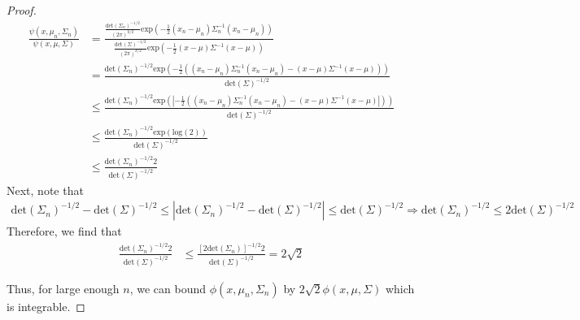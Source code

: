 \documentclass{article}
\begin{document}
\begin{proof}
\begin{align*}
	\frac{\psi(x, \mu_n, \Sigma_n)}{\psi(x, \mu, \Sigma)} &= \frac{\frac{\text{det}(\Sigma_n)^{-1/2}}{(2\pi)^{k/2}}\text{exp}\left( - \frac{1}{2}(x_n - \mu_n)\Sigma_n^{-1}(x_n - \mu_n)\right)}{\frac{\text{det}(\Sigma)^{-1/2}}{(2\pi)^{k/2}}\text{exp}\left( - \frac{1}{2}(x - \mu)\Sigma^{-1}(x - \mu)\right)}\\
	&= \frac{\text{det}(\Sigma_n)^{-1/2}\text{exp}\left(- \frac{1}{2}\left((x_n - \mu_n)\Sigma_n^{-1}(x_n - \mu_n)- (x - \mu)\Sigma^{-1}(x - \mu)\right)\right)}{\text{det}(\Sigma)^{-1/2}} \\
	&\leq \frac{\text{det}(\Sigma_n)^{-1/2}\text{exp}\left( \left| - \frac{1}{2}\left((x_n - \mu_n)\Sigma_n^{-1}(x_n - \mu_n) - (x - \mu)\Sigma^{-1}(x - \mu) \right|\right)\right)}{\text{det}(\Sigma)^{-1/2}} \\
	&\leq \frac{\text{det}(\Sigma_n)^{-1/2}\text{exp}\left(\text{log}(2)\right)}{\text{det}(\Sigma)^{-1/2}} \\
	&\leq \frac{\text{det}(\Sigma_n)^{-1/2} 2 }{\text{det}(\Sigma)^{-1/2}} 
\end{align*}
Next, note that 
\begin{align*}
	\text{det}(\Sigma_n)^{-1/2} - \text{det}(\Sigma)^{-1/2} \leq \left|  \text{det}(\Sigma_n)^{-1/2} - \text{det}(\Sigma)^{-1/2} \right| \leq \text{det}(\Sigma)^{-1/2} \Rightarrow \text{det}(\Sigma_n)^{-1/2} \leq 2\text{det}(\Sigma)^{-1/2}
\end{align*}
Therefore, we find that 
\begin{align*}
	\frac{\text{det}(\Sigma_n)^{-1/2} 2 }{\text{det}(\Sigma)^{-1/2}} &\leq \frac{\left[2\text{det}(\Sigma_n)\right]^{-1/2} 2 }{\text{det}(\Sigma)^{-1/2}} = 2\sqrt{2}
\end{align*}

Thus, for large enough $n$, we can bound $\phi(x, \mu_n, \Sigma_n)$ by $2\sqrt{2} \phi(x, \mu, \Sigma)$ which is integrable.  


\end{proof}
\end{document}
